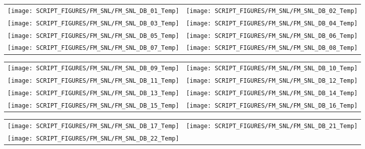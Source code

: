 \begin{figure}[p]
\begin{tabular*}{\textwidth}{l@{\extracolsep{\fill}}r}
\texttt{[image: SCRIPT\_FIGURES/FM\_SNL/FM\_SNL\_DB\_01\_Temp]} &
\texttt{[image: SCRIPT\_FIGURES/FM\_SNL/FM\_SNL\_DB\_02\_Temp]} \\
\texttt{[image: SCRIPT\_FIGURES/FM\_SNL/FM\_SNL\_DB\_03\_Temp]} &
\texttt{[image: SCRIPT\_FIGURES/FM\_SNL/FM\_SNL\_DB\_04\_Temp]} \\
\texttt{[image: SCRIPT\_FIGURES/FM\_SNL/FM\_SNL\_DB\_05\_Temp]} &
\texttt{[image: SCRIPT\_FIGURES/FM\_SNL/FM\_SNL\_DB\_06\_Temp]} \\
\texttt{[image: SCRIPT\_FIGURES/FM\_SNL/FM\_SNL\_DB\_07\_Temp]} &
\texttt{[image: SCRIPT\_FIGURES/FM\_SNL/FM\_SNL\_DB\_08\_Temp]}
\end{tabular*}
\end{figure}

\begin{figure}[p]
\begin{tabular*}{\textwidth}{l@{\extracolsep{\fill}}r}
\texttt{[image: SCRIPT\_FIGURES/FM\_SNL/FM\_SNL\_DB\_09\_Temp]} &
\texttt{[image: SCRIPT\_FIGURES/FM\_SNL/FM\_SNL\_DB\_10\_Temp]} \\
\texttt{[image: SCRIPT\_FIGURES/FM\_SNL/FM\_SNL\_DB\_11\_Temp]} &
\texttt{[image: SCRIPT\_FIGURES/FM\_SNL/FM\_SNL\_DB\_12\_Temp]} \\
\texttt{[image: SCRIPT\_FIGURES/FM\_SNL/FM\_SNL\_DB\_13\_Temp]} &
\texttt{[image: SCRIPT\_FIGURES/FM\_SNL/FM\_SNL\_DB\_14\_Temp]} \\
\texttt{[image: SCRIPT\_FIGURES/FM\_SNL/FM\_SNL\_DB\_15\_Temp]} &
\texttt{[image: SCRIPT\_FIGURES/FM\_SNL/FM\_SNL\_DB\_16\_Temp]}
\end{tabular*}
\end{figure}

\begin{figure}[p]
\begin{tabular*}{\textwidth}{l@{\extracolsep{\fill}}r}
\texttt{[image: SCRIPT\_FIGURES/FM\_SNL/FM\_SNL\_DB\_17\_Temp]} &
\texttt{[image: SCRIPT\_FIGURES/FM\_SNL/FM\_SNL\_DB\_21\_Temp]} \\
\texttt{[image: SCRIPT\_FIGURES/FM\_SNL/FM\_SNL\_DB\_22\_Temp]}
\end{tabular*}
\end{figure}

